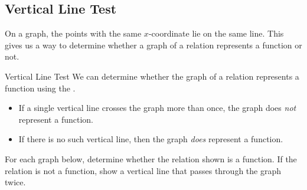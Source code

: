 \subsection{Vertical Line Test} 
On a graph, the points with the same $x$-coordinate lie on the same \makeblank[1.25in] line. This gives us a way to determine whether a graph of a relation represents a function or not.
\begin{procedure}{Vertical Line Test}
We can determine whether the graph of a relation represents a function using the .
\begin{itemize}
\item If a single vertical line crosses the graph more than once, the graph does \emph{not} represent a function.
\item If there is no such vertical line, then the graph \emph{does} represent a function.
\end{itemize}
\end{procedure}
\begin{Example}
For each graph below, determine whether the relation shown is a function. If the relation is not a function, show a vertical line that passes through the graph twice.
\begin{center}
\end{center}
\end{Example}